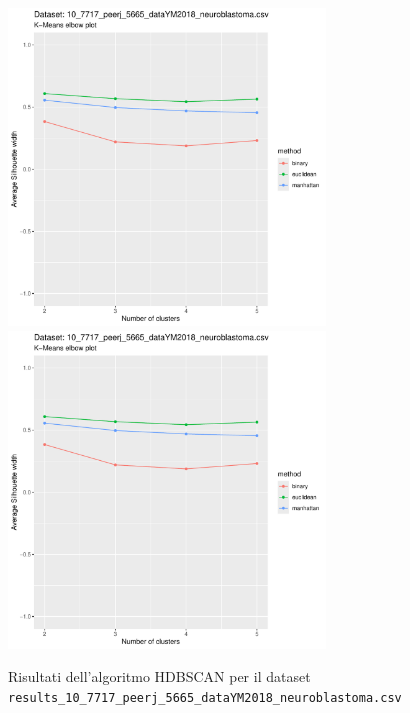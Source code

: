 \documentclass[12pt]{report}
\begin{document}
			\begin{figure}[h]
				\centering
				\includegraphics[width = 0.75\textwidth, height = 0.45\textheight, page = 7]{
					results/results_10_7717_peerj_5665_dataYM2018_neuroblastoma.csv.pdf
				}
				\includegraphics[width = 0.75\textwidth, height = 0.45\textheight, page = 8]{
					results/results_10_7717_peerj_5665_dataYM2018_neuroblastoma.csv.pdf
				}
				\caption{Risultati dell'algoritmo HDBSCAN per il dataset
				\texttt{results\_10\_7717\_peerj\_5665\_dataYM2018\_neuroblastoma.csv}}
				\label{fig:hdbscan3}
			\end{figure}
\end{document}

